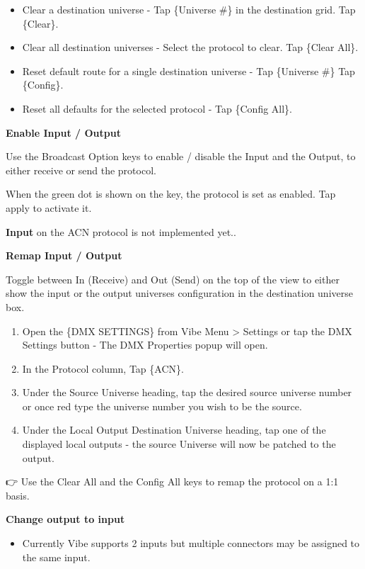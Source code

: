 \documentclass[
]{article}
\providecommand{\tightlist}{%
  \setlength{\itemsep}{0pt}\setlength{\parskip}{0pt}}
\begin{document}
\begin{itemize}
\item
  Clear a destination universe - Tap \{Universe \#\} in the destination grid. Tap \{Clear\}.
\item
  Clear all destination universes - Select the protocol to clear. Tap \{Clear All\}.
\item
  Reset default route for a single destination universe - Tap \{Universe \#\} Tap \{Config\}.
\item
  Reset all defaults for the selected protocol - Tap \{Config All\}.
\end{itemize}

\textbf{Enable Input / Output}

Use the Broadcast Option keys to enable / disable the Input and the Output, to either receive or send the protocol.

When the green dot is shown on the key, the protocol is set as enabled. Tap apply to activate it.

{\textbf{Input} on the ACN protocol is not implemented yet.}.

\textbf{Remap Input / Output}

Toggle between In (Receive) and Out (Send) on the top of the view to either show the input or the output universes configuration in the destination universe box.

\begin{enumerate}
\def\labelenumi{\arabic{enumi}.}
\item
  Open the \{DMX SETTINGS\} from Vibe Menu \textgreater{} Settings or tap the DMX Settings button - The DMX Properties popup will open.
\item
  In the Protocol column, Tap \{ACN\}.
\item
  Under the Source Universe heading, tap the desired source universe number or once red type the universe number you wish to be the source.
\item
  Under the Local Output Destination Universe heading, tap one of the displayed local outputs - the source Universe will now be patched to the output.
\end{enumerate}

👉 Use the Clear All and the Config All keys to remap the protocol on a 1:1 basis.

\textbf{Change output to input}

\begin{itemize}
\tightlist
\item
  Currently Vibe supports 2 inputs but multiple connectors may be assigned to the same input.
\end{itemize}
\end{document}
